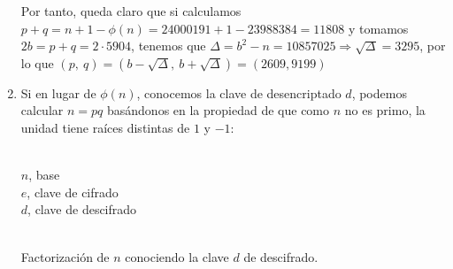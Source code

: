\begin{enumerate}
		Por tanto, queda claro que si calculamos $p+q = n+1-\phi(n) = 24000191+1-23988384 = 11808$ y tomamos $2b = p+q =
		2 \cdot 5904$, tenemos que $\Delta = b^2-n = 10857025 \Rightarrow \sqrt{\Delta} = 3295$, por lo que $(p,\ q) =
		\left(b-\sqrt{\Delta},\ b+\sqrt{\Delta}\right) = (2609, 9199)$
		
		\item Si en lugar de $\phi(n)$, conocemos la clave de desencriptado $d$, podemos calcular $n = pq$ basándonos
		en la propiedad de que como $n$ no es primo, la unidad tiene raíces distintas de $1$ y $-1$:
		
		\begin{algorithm}[H]
			\begin{algorithmic}[1]
				\REQUIRE \ \\
					\texttt{$n$}, base\\
					\texttt{$e$}, clave de cifrado\\
					\texttt{$d$}, clave de descifrado\\ \
					\WHILE{\texttt{$g \in \{1, n\}$ \AND $k \equiv 0 \mod 2$}}
					\ENDWHILE
				\ENDWHILE
				
			\end{algorithmic}
			\caption{Factorización de $n$ conociendo la clave $d$ de descifrado.}
			\label{AtaqueD}
		\end{algorithm}
		

\end{enumerate}
